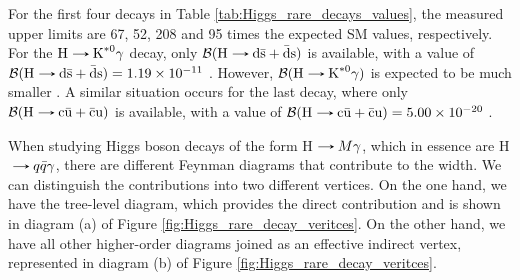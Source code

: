For the first four decays in Table \ref{tab:Higgs_rare_decays_values}, the measured upper limits are 67, 52, 208 and 95 times the expected SM values, respectively. For the $\text{H}\decaysto \text{K}^{*0}\gamma$ decay, only $\mathcal{B}(\text{H}\decaysto \text{d}\bar{\text{s}} + \bar{\text{d}}\text{s})$ is available, with a value of $\mathcal{B}(\text{H}\decaysto \text{d}\bar{\text{s}} + \bar{\text{d}}\text{s}) = 1.19\times 10^{-11}$ \cite{Aranda:2020tqw}. However, $\mathcal{B}(\text{H}\decaysto \text{K}^{*0}\gamma)$ is expected to be much smaller \cite{ATLAS:2023alf}. A similar situation occurs for the last decay, where only $\mathcal{B}(\text{H}\decaysto \text{c}\bar{\text{u}} + \bar{\text{c}}\text{u})$ is available, with a value of $\mathcal{B}(\text{H}\decaysto \text{c}\bar{\text{u}} + \bar{\text{c}}\text{u}) = 5.00\times 10^{-20}$ \cite{Aranda:2020tqw}.

When studying Higgs boson decays of the form H$\decaysto M\gamma$, which in essence are H$\decaysto q\bar{q}\gamma$, there are different Feynman diagrams that contribute to the width. We can distinguish the contributions into two different vertices. On the one hand, we have the tree-level diagram, which provides the direct contribution and is shown in diagram (a) of Figure \ref{fig:Higgs_rare_decay_veritces}. On the other hand, we have all other higher-order diagrams joined as an effective indirect vertex, represented in diagram (b) of Figure \ref{fig:Higgs_rare_decay_veritces}.

